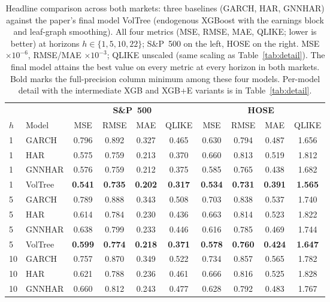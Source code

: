 \documentclass[runningheads]{llncs}
\begin{document}
\begin{table}[t]
\centering
\caption{Headline comparison across both markets: three baselines (GARCH, HAR, GNNHAR) against the paper's
final model VolTree (endogenous XGBoost with the earnings block and leaf-graph smoothing). All four
metrics (MSE, RMSE, MAE, QLIKE; lower is better) at horizons $h\in\{1,5,10,22\}$; S\&P~500 on the left,
HOSE on the right. MSE $\times10^{-6}$, RMSE/MAE $\times10^{-3}$; QLIKE unscaled (same scaling as
Table~\ref{tab:detail}). The final model attains the best value on every metric at every
horizon in both markets. Bold marks the full-precision column minimum among these four models. Per-model
detail with the intermediate XGB and XGB+E variants is in Table~\ref{tab:detail}.}
\label{tab:summary}
\footnotesize
\setlength{\tabcolsep}{3pt}
\begin{tabular}{ll cccc cccc}
\toprule
& & \multicolumn{4}{c}{\textbf{S\&P~500}} & \multicolumn{4}{c}{\textbf{HOSE}} \\
\cmidrule(lr){3-6}\cmidrule(lr){7-10}
$h$ & Model & MSE & RMSE & MAE & QLIKE & MSE & RMSE & MAE & QLIKE \\
\midrule
1 & GARCH    & 0.796 & 0.892 & 0.327 & 0.465 & 0.630 & 0.794 & 0.487 & 1.656 \\
1 & HAR      & 0.575 & 0.759 & 0.213 & 0.370 & 0.660 & 0.813 & 0.519 & 1.812 \\
1 & GNNHAR   & 0.576 & 0.759 & 0.212 & 0.375 & 0.585 & 0.765 & 0.438 & 1.682 \\
1 & VolTree & \textbf{0.541} & \textbf{0.735} & \textbf{0.202} & \textbf{0.317} & \textbf{0.534} & \textbf{0.731} & \textbf{0.391} & \textbf{1.565} \\
\midrule
5 & GARCH    & 0.789 & 0.888 & 0.343 & 0.508 & 0.703 & 0.838 & 0.537 & 1.740 \\
5 & HAR      & 0.614 & 0.784 & 0.230 & 0.436 & 0.663 & 0.814 & 0.523 & 1.822 \\
5 & GNNHAR   & 0.638 & 0.799 & 0.233 & 0.446 & 0.616 & 0.785 & 0.469 & 1.744 \\
5 & VolTree & \textbf{0.599} & \textbf{0.774} & \textbf{0.218} & \textbf{0.371} & \textbf{0.578} & \textbf{0.760} & \textbf{0.424} & \textbf{1.647} \\
\midrule
10 & GARCH    & 0.757 & 0.870 & 0.349 & 0.522 & 0.734 & 0.857 & 0.565 & 1.782 \\
10 & HAR      & 0.621 & 0.788 & 0.236 & 0.461 & 0.666 & 0.816 & 0.525 & 1.828 \\
10 & GNNHAR   & 0.660 & 0.812 & 0.243 & 0.477 & 0.628 & 0.792 & 0.483 & 1.767 \\

\end{tabular}
\end{table}
\end{document}
